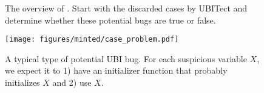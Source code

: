 

\begin{figure}
  \centering
  \scalebox{1.0}{
  \hspace{-5pt}
   
  }
  \caption{The overview of \work. Start with the discarded cases by UBITect
   and determine whether these potential bugs are true or false.
   }
  \label{fig:design-flow}
  \vspace{-5pt}
\end{figure}


\begin{figure}[t]
\hspace{-15pt}
\texttt{[image: figures/minted/case\_problem.pdf]}
\caption{A typical type of potential UBI bug. For each suspicious variable \(X\), we expect it to 1) have an initializer function that probably initializes  \(X\) and 2) use \(X\).  
}
\label{fig:prob_scope}
\end{figure}
